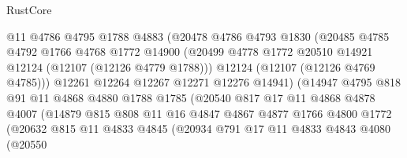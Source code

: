 \begin{lexlean}{RustCore}
\begin{coremodule}
                          @11
                          @4786
                          @4795
                          @1788
                          @4883
                          (@20478
                            @4786
                            @4793
                            @1830
                            (@20485
                              @4785
                              @4792
                              @1766
                              @4768
                              @1772
                              @14900
                              (@20499
                                @4778
                                @1772
                                @20510
                                @14921
                                @12124
                                (@12107 (@12126 @4779 @1788)))
                              @12124
                              (@12107 (@12126 @4769 @4785)))
                            @12261
                            @12264
                            @12267
                            @12271
                            @12276
                            @14941)
                          (@14947
                            @4795
                            @818
                            @91
                            @11
                            @4868
                            @4880
                            @1788
                            @1785
                            (@20540
                              @817
                              @17
                              @11
                              @4868
                              @4878
                              @4007
                              (@14879
                                @815
                                @808
                                @11
                                @16
                                @4847
                                @4867
                                @4877
                                @1766
                                @4800
                                @1772
                                (@20632
                                  @815
                                  @11
                                  @4833
                                  @4845
                                  (@20934
                                    @791
                                    @17
                                    @11
                                    @4833
                                    @4843
                                    @4080
                                    (@20550

\end{coremodule}
\end{lexlean}
